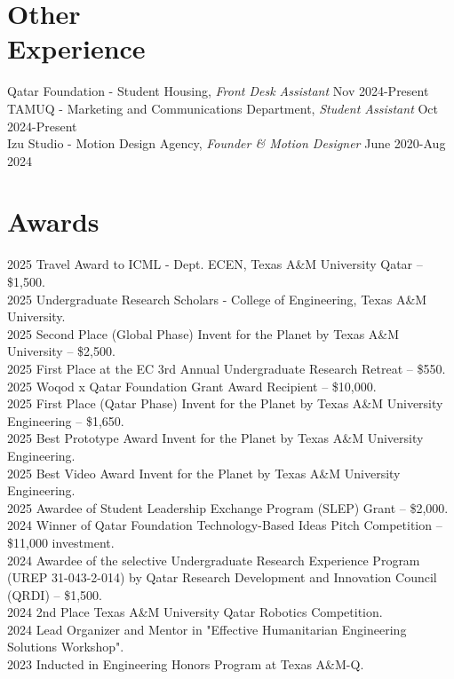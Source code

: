 \documentclass[resmargin, 10pt]{res} %
\begin{document}
\begin{resume}
\section{Other \\ Experience} 

Qatar Foundation - Student Housing, {\sl Front Desk Assistant} \hfill Nov 2024-Present \\
TAMUQ - Marketing and Communications Department, {\sl Student Assistant} \hfill Oct 2024-Present\\
Izu Studio - Motion Design Agency, {\sl Founder \& Motion Designer} \hfill June 2020-Aug 2024


\vspace{-5pt}
\section{Awards}
2025 Travel Award to ICML - Dept. ECEN, Texas A\&M University Qatar -- \$1,500. \\
2025 Undergraduate Research Scholars - College of Engineering, Texas A\&M University. \\
2025 Second Place (Global Phase) Invent for the Planet by Texas A\&M University -- \$2,500. \\
2025 First Place at the EC 3rd Annual Undergraduate Research Retreat -- \$550. \\
2025 Woqod x Qatar Foundation Grant Award Recipient -- \$10,000. \\
2025 First Place (Qatar Phase) Invent for the Planet by Texas A\&M University Engineering -- \$1,650. \\
2025 Best Prototype Award Invent for the Planet by Texas A\&M University Engineering. \\
2025 Best Video Award Invent for the Planet by Texas A\&M University Engineering. \\
2025 Awardee of Student Leadership Exchange Program (SLEP) Grant -- \$2,000. \\
2024 Winner of Qatar Foundation Technology-Based Ideas Pitch Competition -- \$11,000 investment.\\
2024 Awardee of the selective Undergraduate Research Experience Program (UREP 31-043-2-014) by Qatar Research Development and Innovation Council (QRDI) -- \$1,500.\\
2024 2nd Place Texas A\&M University Qatar Robotics Competition.\\
2024 Lead Organizer and Mentor in "Effective Humanitarian Engineering Solutions Workshop".\\
2023 Inducted in Engineering Honors Program at Texas A\&M-Q. 


\end{resume}
\end{document}
